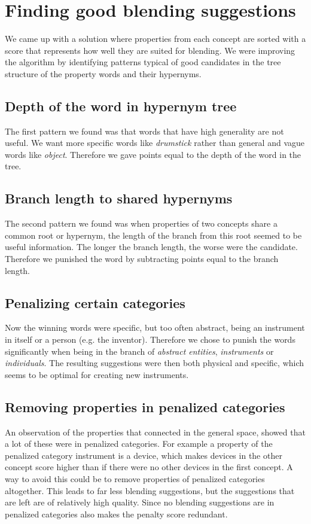 
\section{Finding good blending suggestions}
We came up with a solution where properties from each concept are sorted with a score that represents how well they are suited for blending. We were improving the algorithm by identifying patterns typical of good candidates in the tree structure of the property words and their hypernyms.
\subsection{Depth of the word in hypernym tree}
The first pattern we found was that words that have high generality are not useful. We want more specific words like \emph{drumstick} rather than general and vague words like \emph{object}. Therefore we gave points equal to the depth of the word in the tree.
\subsection{Branch length to shared hypernyms}
The second pattern we found was when properties of two concepts share a common root or hypernym, the length of the branch from this root seemed to be useful information. The longer the branch length, the worse were the candidate. Therefore we punished the word by subtracting points equal to the branch length.
\subsection{Penalizing certain categories}
Now the winning words were specific, but too often abstract, being an instrument in itself or a person (e.g. the inventor). Therefore we chose to punish the words significantly when being in the branch of \emph{abstract entities}, \emph{instruments} or \emph{individuals}. The resulting suggestions were then both physical and specific, which seems to be optimal for creating new instruments.
\subsection{Removing properties in penalized categories}
An observation of the properties that connected in the general space, showed that a lot of these were in penalized categories. For example a property of the penalized category instrument is a device, which makes devices in the other concept score higher than if there were no other devices in the first concept. A way to avoid this could be to remove properties of penalized categories altogether. This leads to far less blending suggestions, but the suggestions that are left are of relatively high quality. Since no blending suggestions are in penalized categories also makes the penalty score redundant.

